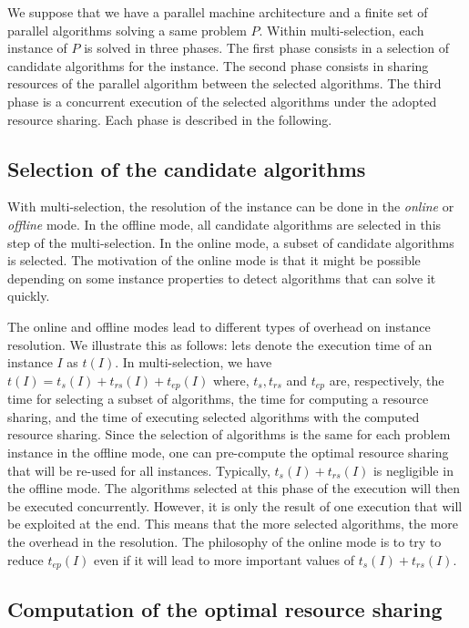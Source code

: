 We suppose that we have a parallel machine architecture and a finite set of parallel 
algorithms solving a same problem $P$. 
Within multi-selection, each instance of $P$ is solved in three phases. 
The first phase consists in a selection of candidate algorithms for the instance. 
The second phase consists in sharing resources of the parallel algorithm between 
the selected algorithms.  
The third phase is a concurrent execution of the selected algorithms under the 
adopted resource sharing. Each phase is described in the following.

\subsection{Selection of the candidate algorithms} 
With multi-selection, the resolution of the instance can be done in the \textit{online} or 
\textit{offline} mode. In the offline mode, all candidate algorithms are selected in this step 
of the multi-selection. In the online mode, a subset of candidate algorithms is selected. 
The motivation of the online mode is that it might be possible depending on some instance
properties  to detect algorithms that can solve it quickly. 

The online and offline modes lead to different types of overhead on instance resolution. 
We illustrate this as follows: lets denote the execution time of an instance $I$ as $t(I)$. 
In multi-selection, we have $t(I) = t_s(I) + t_{rs}(I) + t_{ep}(I)$ where,  
$t_s, t_{rs}$ and $t_{ep}$ are, respectively, the time for selecting a subset of algorithms, the time 
for computing a resource sharing, and the 
time of executing selected algorithms with the computed resource sharing.
Since the selection of algorithms is the same for each problem instance in the offline mode, one can 
pre-compute the optimal resource sharing that will be re-used for all instances. Typically, 
$t_s(I) + t_{rs}(I)$ is negligible in the offline mode.
The algorithms selected at this phase of the execution will then be executed concurrently. However, 
it is only the result of one execution that will be exploited at the end. This means that the more  
selected algorithms, the more the overhead in the resolution.
The philosophy of the online mode is to try to reduce $t_{ep}(I)$ even if it will lead to more important
values of $t_s(I) + t_{rs}(I)$.


\subsection{Computation of the optimal resource sharing} 


